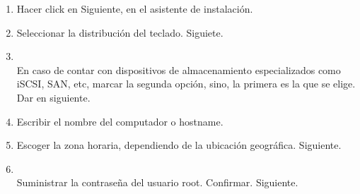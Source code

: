 \documentclass[11pt]{article}
\begin{document}
\begin{enumerate}
		    \item Hacer click en Siguiente, en el asistente de instalación.
		    \item Seleccionar la distribución del teclado. Siguiete.
		    \item 
		    	\begin{minipage}[t]{\linewidth}
			        \raggedright
			        \medskip
			        \\En caso de contar con dispositivos de almacenamiento especializados como iSCSI, SAN, etc, marcar la segunda opción, sino, la primera es la que se elige. Dar en siguiente. 
		        \end{minipage}	

		    \item Escribir el nombre del computador o hostname.
		    \item Escoger la zona horaria, dependiendo de la ubicación geográfica. Siguiente.
		    \item 
		    	\begin{minipage}[t]{\linewidth}
			        \raggedright
			        \medskip
			        \\Suministrar la contraseña del usuario root. Confirmar. Siguiente. 
		        \end{minipage}


\end{enumerate}
\end{document}
